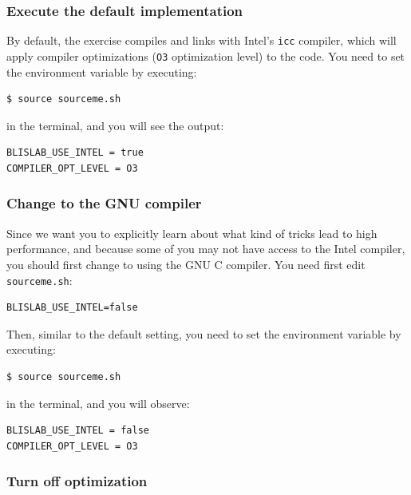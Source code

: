 \subsubsection{Execute the default implementation}
By default, the exercise compiles and links with Intel's {\tt icc} compiler, which will apply compiler optimizations ({\tt O3} optimization level) to the code.
You need to set the environment variable by executing:
\begin{verbatim}
$ source sourceme.sh
\end{verbatim}
in the terminal, and you will see the output:
\begin{verbatim}
BLISLAB_USE_INTEL = true
COMPILER_OPT_LEVEL = O3
\end{verbatim}

\subsubsection{Change to the GNU compiler}

Since we want you to explicitly learn about what kind of tricks lead to high performance, and because some of you may not have access to the Intel compiler, you should first change to using the GNU C compiler.
You need first edit {\tt sourceme.sh}: 
\begin{verbatim}
BLISLAB_USE_INTEL=false
\end{verbatim}
Then, similar to the default setting, you need to set the environment variable by executing:
\begin{verbatim}
$ source sourceme.sh
\end{verbatim}
in the terminal, and you will observe:
\begin{verbatim}
BLISLAB_USE_INTEL = false
COMPILER_OPT_LEVEL = O3
\end{verbatim}

\subsubsection{Turn off optimization}

